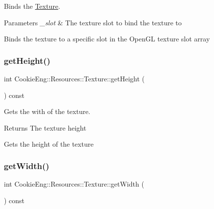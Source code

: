 Binds the \hyperlink{class_cookie_eng_1_1_resources_1_1_texture}{Texture}. 


\begin{DoxyParams}{Parameters}
{\em \+\_\+slot} & The texture slot to bind the texture to\\
\hline
\end{DoxyParams}
Binds the texture to a specific slot in the Open\+GL texture slot array \mbox{\label{class_cookie_eng_1_1_resources_1_1_texture_ac030b164a876de42ad141e9aab422a1c}} 
\subsubsection{\texorpdfstring{get\+Height()}{getHeight()}}
{\footnotesize\ttfamily int Cookie\+Eng\+::\+Resources\+::\+Texture\+::get\+Height (\begin{DoxyParamCaption}{ }\end{DoxyParamCaption}) const\hspace{0.3cm}{\ttfamily [inline]}}



Gets the with of the texture. 

\begin{DoxyReturn}{Returns}
The texture height
\end{DoxyReturn}
Gets the height of the texture \mbox{\label{class_cookie_eng_1_1_resources_1_1_texture_a8f7b83fbbd885d0380100975fe9f5831}} 
\subsubsection{\texorpdfstring{get\+Width()}{getWidth()}}
{\footnotesize\ttfamily int Cookie\+Eng\+::\+Resources\+::\+Texture\+::get\+Width (\begin{DoxyParamCaption}{ }\end{DoxyParamCaption}) const\hspace{0.3cm}{\ttfamily [inline]}}



